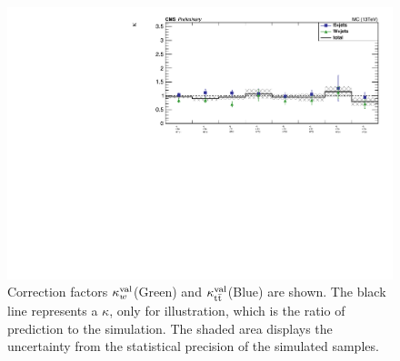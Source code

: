 \begin{figure}[!hbt]
    \begin{center}
 \includegraphics[width=0.8 \textwidth]{Plots/analysis/RCS/Spring16_templates_validation_4j_Moriond2017_lep_data_Kappa}
  \caption[The factors $\kappa_w^{\rm val}$ and the factors $\kappa_{\ttbar}^{\rm val}$ are shown.]{ \label{kappaVal} Correction factors $\kappa_w^{\rm val}$(Green) and $\kappa_{\ttbar}^{\rm val}$(Blue) are shown. The black line represents a $\kappa$, only for illustration, which is the ratio of prediction to the simulation. The shaded area displays the uncertainty from the statistical precision of the simulated samples.}
  \end{center}
\end{figure}
